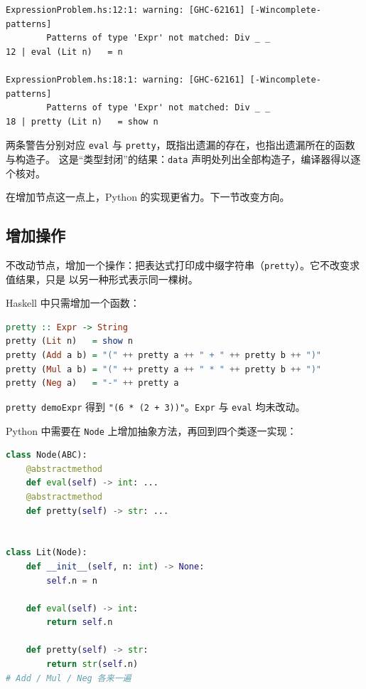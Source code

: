 \begin{lstlisting}
ExpressionProblem.hs:12:1: warning: [GHC-62161] [-Wincomplete-patterns]
        Patterns of type 'Expr' not matched: Div _ _
12 | eval (Lit n)   = n

ExpressionProblem.hs:18:1: warning: [GHC-62161] [-Wincomplete-patterns]
        Patterns of type 'Expr' not matched: Div _ _
18 | pretty (Lit n)   = show n
\end{lstlisting}

两条警告分别对应 \passthrough{\lstinline!eval!} 与 \passthrough{\lstinline!pretty!}，既指出遗漏的存在，也指出遗漏所在的函数与构造子。
这是“类型封闭”的结果：\passthrough{\lstinline!data!} 声明处列出全部构造子，编译器得以逐个核对。

在增加节点这一点上，Python 的实现更省力。下一节改变方向。

\subsection{增加操作}\label{ux589eux52a0ux64cdux4f5c}

不改动节点，增加一个操作：把表达式打印成中缀字符串（\passthrough{\lstinline!pretty!}）。它不改变求值结果，只是
以另一种形式表示同一棵树。

Haskell 中只需增加一个函数：

\begin{lstlisting}[language=Haskell]
pretty :: Expr -> String
pretty (Lit n)   = show n
pretty (Add a b) = "(" ++ pretty a ++ " + " ++ pretty b ++ ")"
pretty (Mul a b) = "(" ++ pretty a ++ " * " ++ pretty b ++ ")"
pretty (Neg a)   = "-" ++ pretty a
\end{lstlisting}

\passthrough{\lstinline!pretty demoExpr!} 得到 \passthrough{\lstinline!"(6 * (2 + 3))"!}。\passthrough{\lstinline!Expr!} 与 \passthrough{\lstinline!eval!} 均未改动。

Python 中需要在 \passthrough{\lstinline!Node!} 上增加抽象方法，再回到四个类逐一实现：

\begin{lstlisting}[language=Python]
class Node(ABC):
    @abstractmethod
    def eval(self) -> int: ...
    @abstractmethod
    def pretty(self) -> str: ...


class Lit(Node):
    def __init__(self, n: int) -> None:
        self.n = n

    def eval(self) -> int:
        return self.n

    def pretty(self) -> str:
        return str(self.n)
# Add / Mul / Neg 各来一遍
\end{lstlisting}

